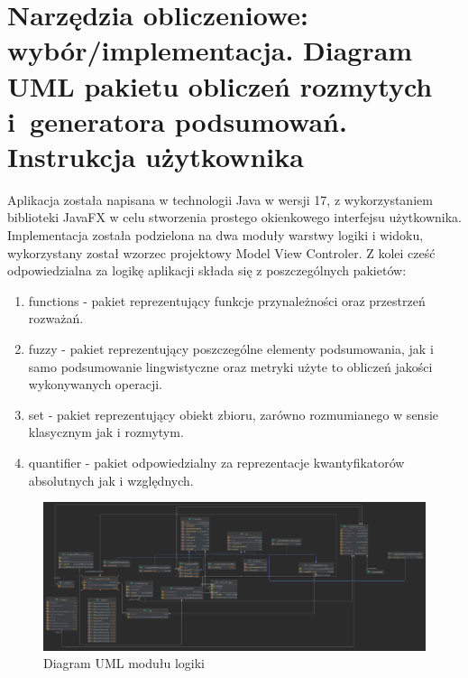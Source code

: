 \documentclass{classrep}
\begin{document}


\section{Narzędzia obliczeniowe: wybór/implementacja. Diagram UML pakietu
obliczeń rozmytych i~generatora podsumowań. Instrukcja użytkownika}

Aplikacja została napisana w technologii Java w wersji 17, z wykorzystaniem biblioteki JavaFX \cite{javafx} w celu stworzenia prostego
okienkowego interfejsu użytkownika.\\

Implementacja została podzielona na dwa moduły warstwy logiki i widoku, wykorzystany został wzorzec projektowy Model View Controler. Z kolei cześć odpowiedzialna za logikę aplikacji składa się z poszczególnych pakietów:
\begin{enumerate}
  \item functions - pakiet reprezentujący funkcje przynależności oraz przestrzeń rozważań. 
  
  \item fuzzy - pakiet reprezentujący poszczególne elementy podsumowania, jak i samo podsumowanie lingwistyczne oraz metryki użyte to obliczeń jakości wykonywanych operacji.
  \item set - pakiet reprezentujący obiekt zbioru, zarówno rozmumianego w sensie klasycznym jak i rozmytym.
  \item quantifier - pakiet odpowiedzialny za reprezentacje kwantyfikatorów absolutnych jak i względnych. 
\end{enumerate}


  \begin{figure}[H]
    \includegraphics[scale = 0.08]{all}
    \caption{Diagram UML modułu logiki}
  \end{figure}
\end{document}
